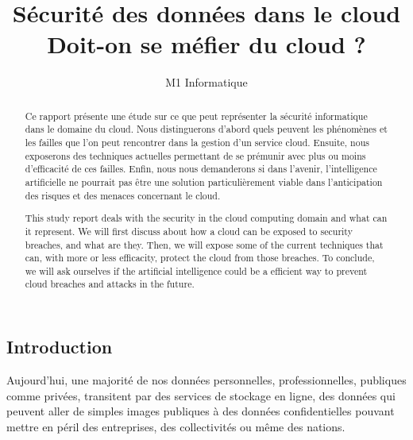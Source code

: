 \documentclass[a4paper, 12pt]{article}
\title{Sécurité des données dans le cloud\\Doit-on se méfier du cloud ?}
\author{M1 Informatique}
\date{}
\begin{document}
  \begin{spacing}{1.1}
  \renewcommand{\thepage}{}
  \maketitle
  \newpage
  \tableofcontents
  \newpage

  \renewcommand{\thepage}{\arabic{page}}
  \setcounter{page}{1}
  \begin{abstract}
    Ce rapport présente une étude sur ce que peut représenter la sécurité
    informatique dans le domaine du cloud. Nous distinguerons d'abord quels
    peuvent les phénomènes et les failles que l'on peut rencontrer dans la
    gestion d'un service cloud. Ensuite, nous exposerons des techniques
    actuelles permettant de se prémunir avec plus ou moins d'efficacité de ces
    failles. Enfin, nous nous demanderons si dans l'avenir, l'intelligence
    artificielle ne pourrait pas être une solution particulièrement viable dans
    l'anticipation des risques et des menaces concernant le cloud.
  \end{abstract}

  \begin{abstract}
    This study report deals with the security in the cloud computing domain and
    what can it represent. We will first discuss about how a cloud can be
    exposed to security breaches, and what are they. Then, we will expose some
    of the current techniques that can, with more or less efficacity, protect
    the cloud from those breaches. To conclude, we will ask ourselves if the
    artificial intelligence could be a efficient way to prevent cloud breaches
    and attacks in the future.
  \end{abstract}

  \newpage
  \section{Introduction}
    Aujourd'hui, une majorité de nos données personnelles, professionnelles,
    publiques comme privées, transitent par des services de stockage en ligne,
    des données qui peuvent aller de simples images publiques à des données
    confidentielles pouvant mettre en péril des entreprises, des collectivités
    ou même des nations. \\


\end{spacing}
\end{document}
